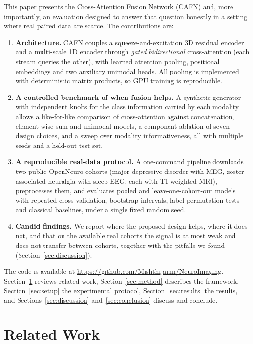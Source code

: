 This paper presents the Cross-Attention Fusion Network (CAFN) and, more importantly, an evaluation designed to answer that question honestly in a setting where real paired data are scarce. The contributions are:
\begin{enumerate}
\item \textbf{Architecture.} CAFN couples a squeeze-and-excitation 3D residual encoder and a multi-scale 1D encoder through \emph{gated bidirectional} cross-attention (each stream queries the other), with learned attention pooling, positional embeddings and two auxiliary unimodal heads. All pooling is implemented with deterministic matrix products, so GPU training is reproducible.
\item \textbf{A controlled benchmark of when fusion helps.} A synthetic generator with independent knobs for the class information carried by each modality allows a like-for-like comparison of cross-attention against concatenation, element-wise sum and unimodal models, a component ablation of seven design choices, and a sweep over modality informativeness, all with multiple seeds and a held-out test set.
\item \textbf{A reproducible real-data protocol.} A one-command pipeline downloads two public OpenNeuro cohorts (major depressive disorder with MEG, zoster-associated neuralgia with sleep EEG, each with T1-weighted MRI), preprocesses them, and evaluates pooled and leave-one-cohort-out models with repeated cross-validation, bootstrap intervals, label-permutation tests and classical baselines, under a single fixed random seed.
\item \textbf{Candid findings.} We report where the proposed design helps, where it does not, and that on the available real cohorts the signal is at most weak and does not transfer between cohorts, together with the pitfalls we found (Section~\ref{sec:discussion}).
\end{enumerate}
The code is available at \url{https://github.com/Mishthijainn/NeuroImaging}. Section~\ref{sec:related} reviews related work, Section~\ref{sec:method} describes the framework, Section~\ref{sec:setup} the experimental protocol, Section~\ref{sec:results} the results, and Sections~\ref{sec:discussion} and~\ref{sec:conclusion} discuss and conclude.

\section{Related Work}\label{sec:related}
